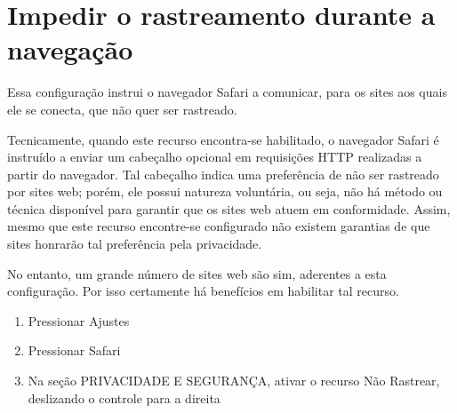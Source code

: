 \section{Impedir o rastreamento durante a navega\c c\~ao}

Essa configura\c c\~ao instrui o navegador Safari a comunicar, para os sites aos quais ele se conecta, que n\~ao quer ser rastreado.

Tecnicamente, quando este recurso encontra-se habilitado, o navegador Safari \'e instru\'ido a enviar um cabe\c calho opcional em requisi\c c\~oes HTTP realizadas a partir do navegador. Tal cabe\c calho indica uma prefer\^encia de n\~ao ser rastreado por sites web; por\'em, ele possui natureza volunt\'aria, ou seja, n\~ao h\'a m\'etodo ou t\'ecnica dispon\'ivel para garantir que os sites web atuem em conformidade. Assim, mesmo que este recurso encontre-se configurado n\~ao existem garantias de que sites honrar\~ao tal prefer\^encia pela privacidade. 

No entanto, um grande n\'umero de sites web s\~ao sim, aderentes a esta configura\c c\~ao. Por isso certamente h\'a benef\'icios em habilitar tal recurso.

\begin{enumerate}
\item Pressionar Ajustes
\item Pressionar Safari
\item Na se\c c\~ao PRIVACIDADE E SEGURAN\c CA, ativar o recurso N\~ao Rastrear, deslizando o controle para a direita
\end{enumerate}
